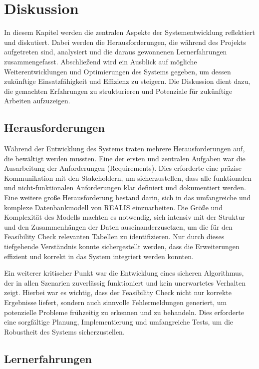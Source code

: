 \chapter{Diskussion}
In diesem Kapitel werden die zentralen Aspekte der Systementwicklung reflektiert und diskutiert. Dabei werden die Herausforderungen, die während des Projekts aufgetreten sind, analysiert und die daraus gewonnenen Lernerfahrungen zusammengefasst. Abschließend wird ein Ausblick auf mögliche Weiterentwicklungen und Optimierungen des Systems gegeben, um dessen zukünftige Einsatzfähigkeit und Effizienz zu steigern. Die Diskussion dient dazu, die gemachten Erfahrungen zu strukturieren und Potenziale für zukünftige Arbeiten aufzuzeigen.
\section{Herausforderungen}

Während der Entwicklung des Systems traten mehrere Herausforderungen auf, die bewältigt werden mussten. Eine der ersten und zentralen Aufgaben war die Ausarbeitung der Anforderungen (Requirements). Dies erforderte eine präzise Kommunikation mit den Stakeholdern, um sicherzustellen, dass alle funktionalen und nicht-funktionalen Anforderungen klar definiert und dokumentiert werden. Eine weitere große Herausforderung bestand darin, sich in das umfangreiche und komplexe Datenbankmodell von \gls{REALIS} einzuarbeiten. Die Größe und Komplexität des Modells machten es notwendig, sich intensiv mit der Struktur und den Zusammenhängen der Daten auseinanderzusetzen, um die für den Feasibility Check relevanten Tabellen zu identifizieren. Nur durch dieses tiefgehende Verständnis konnte sichergestellt werden, dass die Erweiterungen effizient und korrekt in das System integriert werden konnten.

Ein weiterer kritischer Punkt war die Entwicklung eines sicheren Algorithmus, der in allen Szenarien zuverlässig funktioniert und kein unerwartetes Verhalten zeigt. Hierbei war es wichtig, dass der Feasibility Check nicht nur korrekte Ergebnisse liefert, sondern auch sinnvolle Fehlermeldungen generiert, um potenzielle Probleme frühzeitig zu erkennen und zu behandeln. Dies erforderte eine sorgfältige Planung, Implementierung und umfangreiche Tests, um die Robustheit des Systems sicherzustellen.

\section{Lernerfahrungen}


